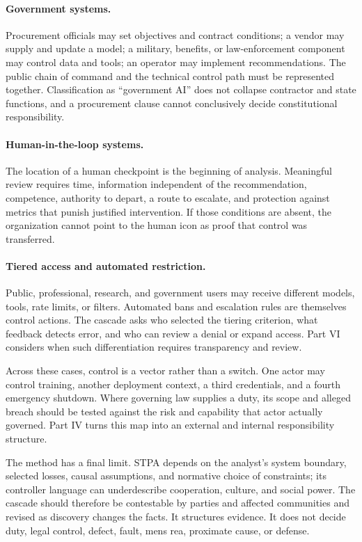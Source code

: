 \paragraph{Government systems.}
Procurement officials may set objectives and contract conditions; a vendor may supply and update a model; a military, benefits, or law-enforcement component may control data and tools; an operator may implement recommendations. The public chain of command and the technical control path must be represented together. Classification as ``government AI'' does not collapse contractor and state functions, and a procurement clause cannot conclusively decide constitutional responsibility.

\paragraph{Human-in-the-loop systems.}
The location of a human checkpoint is the beginning of analysis. Meaningful review requires time, information independent of the recommendation, competence, authority to depart, a route to escalate, and protection against metrics that punish justified intervention. If those conditions are absent, the organization cannot point to the human icon as proof that control was transferred.

\paragraph{Tiered access and automated restriction.}
Public, professional, research, and government users may receive different models, tools, rate limits, or filters. Automated bans and escalation rules are themselves control actions. The cascade asks who selected the tiering criterion, what feedback detects error, and who can review a denial or expand access. Part VI considers when such differentiation requires transparency and review.

Across these cases, control is a vector rather than a switch. One actor may control training, another deployment context, a third credentials, and a fourth emergency shutdown. Where governing law supplies a duty, its scope and alleged breach should be tested against the risk and capability that actor actually governed. Part IV turns this map into an external and internal responsibility structure.

The method has a final limit. STPA depends on the analyst's system boundary, selected losses, causal assumptions, and normative choice of constraints; its controller language can underdescribe cooperation, culture, and social power. The cascade should therefore be contestable by parties and affected communities and revised as discovery changes the facts. It structures evidence. It does not decide duty, legal control, defect, fault, mens rea, proximate cause, or defense.
